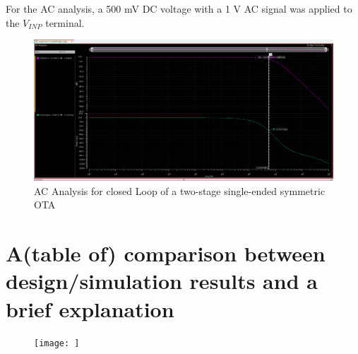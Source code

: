 For the AC analysis, a 500 mV DC voltage with a 1 V AC signal was applied to the $V_{INP}$ terminal.
    \begin{figure}[h]
        \centering
           \includegraphics[width=1\textwidth]{images/two_stage_ota_close_ac.png}
        \caption{AC Analysis for closed Loop of a two-stage single-ended symmetric OTA }
        \label{fig: }
    \end{figure}






\section{ A(table of) comparison between design/simulation results and a brief explanation}





    \begin{figure}[h]
        \centering
           \texttt{[image: ]}
        \caption{}
        \label{fig: }
    \end{figure}

\endinput